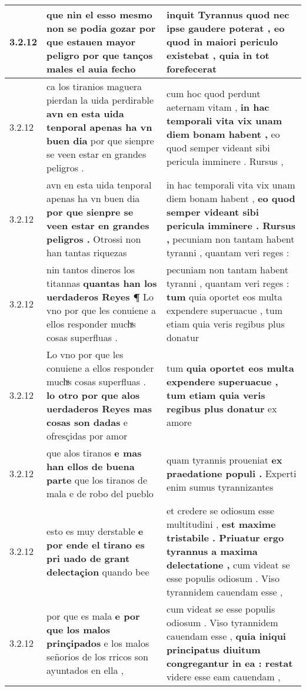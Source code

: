 \begin{tabular}{|p{1cm}|p{6.5cm}|p{6.5cm}|}
3.2.12 & que nin el esso mesmo non se podia gozar \textbf{ por que estauen mayor peligro } por que tanços males el auia fecho & inquit Tyrannus quod nec ipse gaudere poterat , \textbf{ eo quod in maiori periculo existebat , } quia in tot forefecerat \\\hline
3.2.12 & ca los tiranios maguera pierdan la uida perdirable \textbf{ avn en esta uida tenporal apenas ha vn buen dia } por que sienpre se veen estar en grandes peligros . & cum hoc quod perdunt aeternam vitam , \textbf{ in hac temporali vita vix unam diem bonam habent , } eo quod semper videant sibi pericula imminere . Rursus , \\\hline
3.2.12 & avn en esta uida tenporal apenas ha vn buen dia \textbf{ por que sienpre se veen estar en grandes peligros . } Otrossi non han tantas riquezas & in hac temporali vita vix unam diem bonam habent , \textbf{ eo quod semper videant sibi pericula imminere . Rursus , } pecuniam non tantam habent tyranni , quantam veri reges : \\\hline
3.2.12 & nin tantos dineros los titannas \textbf{ quantas han los uerdaderos Reyes ¶ } Lo vno por que les conuiene a ellos responder muchͣs cosas superfluas . & pecuniam non tantam habent tyranni , quantam veri reges : \textbf{ tum } quia oportet eos multa expendere superuacue , tum etiam quia veris regibus plus donatur \\\hline
3.2.12 & Lo vno por que les conuiene a ellos responder muchͣs cosas superfluas . \textbf{ lo otro por que alos uerdaderos Reyes mas cosas son dadas } e ofresçidas por amor & tum \textbf{ quia oportet eos multa expendere superuacue , tum etiam quia veris regibus plus donatur } ex amore \\\hline
3.2.12 & que alos tiranos \textbf{ e mas han ellos de buena parte } que los tiranos de mala e de robo del pueblo & quam tyrannis proueniat \textbf{ ex praedatione populi . } Experti enim sumus tyrannizantes \\\hline
3.2.12 & esto es muy derstable \textbf{ e por ende el tirano es pri uado de grant delectaçion } quando bee & et credere se odiosum esse multitudini , \textbf{ est maxime tristabile . Priuatur ergo tyrannus a maxima delectatione , } cum videat se esse populis odiosum . Viso tyrannidem cauendam esse , \\\hline
3.2.12 & por que es mala \textbf{ e por que los malos prinçipados } e los malos señorios de los rricos son ayuntados en ella , & cum videat se esse populis odiosum . Viso tyrannidem cauendam esse , \textbf{ quia iniqui principatus diuitum congregantur in ea : restat } videre esse eam cauendam , \\\hline

\end{tabular}
